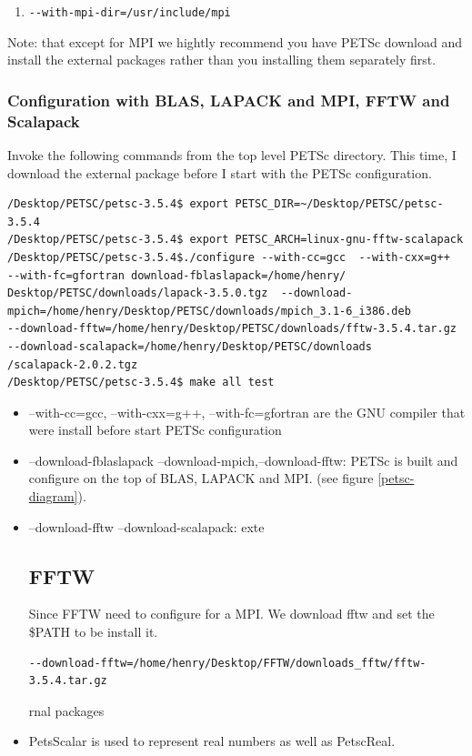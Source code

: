 \documentclass{article}
\begin{document}
\begin{itemize}
\begin{enumerate}
  \item \verb+--with-mpi-dir=/usr/include/mpi+
\end{enumerate}
\normalsize
\end{itemize}
Note: that except for MPI we hightly recommend you have PETSc download and install the external packages rather than you installing them
separately first. 

\subsubsection{Configuration with BLAS, LAPACK and MPI, FFTW and Scalapack}
Invoke the following commands from the top level PETSc directory. This time, I download the external package before I start with the PETSc configuration.
\footnotesize
\begin{verbatim} 
/Desktop/PETSC/petsc-3.5.4$ export PETSC_DIR=~/Desktop/PETSC/petsc-3.5.4
/Desktop/PETSC/petsc-3.5.4$ export PETSC_ARCH=linux-gnu-fftw-scalapack
/Desktop/PETSC/petsc-3.5.4$./configure --with-cc=gcc  --with-cxx=g++  --with-fc=gfortran download-fblaslapack=/home/henry/
Desktop/PETSC/downloads/lapack-3.5.0.tgz  --download-mpich=/home/henry/Desktop/PETSC/downloads/mpich_3.1-6_i386.deb   
--download-fftw=/home/henry/Desktop/PETSC/downloads/fftw-3.5.4.tar.gz  --download-scalapack=/home/henry/Desktop/PETSC/downloads
/scalapack-2.0.2.tgz
/Desktop/PETSC/petsc-3.5.4$ make all test 
\end{verbatim}
\begin{itemize}
 \item --with-cc=gcc, --with-cxx=g++, --with-fc=gfortran are the GNU compiler that were install before start PETSc configuration
 \item --download-fblaslapack --download-mpich,--download-fftw: PETSc is built and configure on the top of BLAS, LAPACK and MPI. 
 (see figure \ref{petsc-diagram}). 
  \item --download-fftw --download-scalapack: exte\subsection{FFTW}
Since FFTW need to configure for a MPI. We download fftw and set the \$PATH to be install it.  
\begin{verbatim}
--download-fftw=/home/henry/Desktop/FFTW/downloads_fftw/fftw-3.5.4.tar.gz
\end{verbatim}rnal packages
  \item PetsScalar is used to represent real numbers as well as PetscReal.
\end{itemize}
\end{document}
